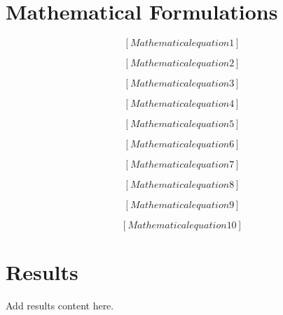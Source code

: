\documentclass[11pt,a4paper]{article}
\begin{document}
\section{Mathematical Formulations}

\begin{equation}
\label{eq:form_1}
[Mathematical equation 1]
\end{equation}

\begin{equation}
\label{eq:form_2}
[Mathematical equation 2]
\end{equation}

\begin{equation}
\label{eq:form_3}
[Mathematical equation 3]
\end{equation}

\begin{equation}
\label{eq:form_4}
[Mathematical equation 4]
\end{equation}

\begin{equation}
\label{eq:form_5}
[Mathematical equation 5]
\end{equation}

\begin{equation}
\label{eq:form_6}
[Mathematical equation 6]
\end{equation}

\begin{equation}
\label{eq:form_7}
[Mathematical equation 7]
\end{equation}

\begin{equation}
\label{eq:form_8}
[Mathematical equation 8]
\end{equation}

\begin{equation}
\label{eq:form_9}
[Mathematical equation 9]
\end{equation}

\begin{equation}
\label{eq:form_10}
[Mathematical equation 10]
\end{equation}



\section{Results}
\label{sec:results}

Add results content here.
\end{document}
